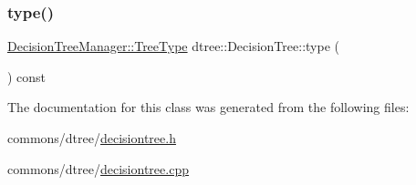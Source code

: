 \subsubsection{\texorpdfstring{type()}{type()}}
{\footnotesize\ttfamily \mbox{\hyperlink{classdtree_1_1_decision_tree_manager_a14180eb59d2c245ce3af1c27ddb0846d}{Decision\+Tree\+Manager\+::\+Tree\+Type}} dtree\+::\+Decision\+Tree\+::type (\begin{DoxyParamCaption}{ }\end{DoxyParamCaption}) const\hspace{0.3cm}{\ttfamily [inline]}}



The documentation for this class was generated from the following files\+:\begin{DoxyCompactItemize}
\item 
commons/dtree/\mbox{\hyperlink{decisiontree_8h}{decisiontree.\+h}}\item 
commons/dtree/\mbox{\hyperlink{decisiontree_8cpp}{decisiontree.\+cpp}}\end{DoxyCompactItemize}
